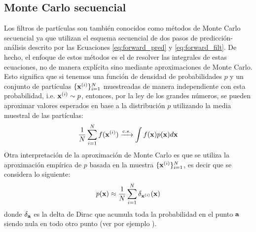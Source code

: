 \subsection{Monte Carlo secuencial}


Los filtros de partículas son también conocidos como métodos de Monte Carlo secuencial ya que utilizan el esquema secuencial de dos pasos de predicción-análisis descrito por las Ecuaciones \ref{eq:forward_pred} y \ref{eq:forward_filt}. De hecho, el enfoque de estos métodos es el de resolver las integrales de estas ecuaciones, no de manera explícita sino mediante aproximaciones de Monte Carlo. Esto significa que si tenemos una función de densidad de probabilidades $p$ y un conjunto de partículas $\{\mathbf{x}^{(i)}\}_{i=1}^N$ muestreadas de manera independiente con esta probabilidad, i.e. $\mathbf{x}^{(i)}\sim p$, entonces, por la ley de los grandes números, se pueden aproximar valores esperados en base a la distribución $p$ utilizando la media muestral de las partículas:
\begin{align*}
    \frac{1}{N}\sum_{i=1}^N f(\mathbf{x}^{(i)}) \xrightarrow{c. s.} \int f(\mathbf{x}) p(\mathbf{x}) d \mathbf{x}
\end{align*}
Otra interpretación de la aproximación de Monte Carlo es que se utiliza la aproximación empírica de $p$ basada en la muestra $\{\mathbf{x}^{(i)}\}_{i=1}^N$, es decir que se considera lo siguiente:
\begin{align*}
    p(\mathbf{x}) \approx \frac{1}{N}\sum_{i=1}^N \delta_{\mathbf{x}^{(i)}}(\mathbf{x})
\end{align*}
donde $\delta_{\mathbf{a}}$ es la delta de Dirac que acumula toda la probabilidad en el punto $\mathbf{a}$ siendo nula en todo otro punto (ver por ejemplo \cite{Doucet2001}).

